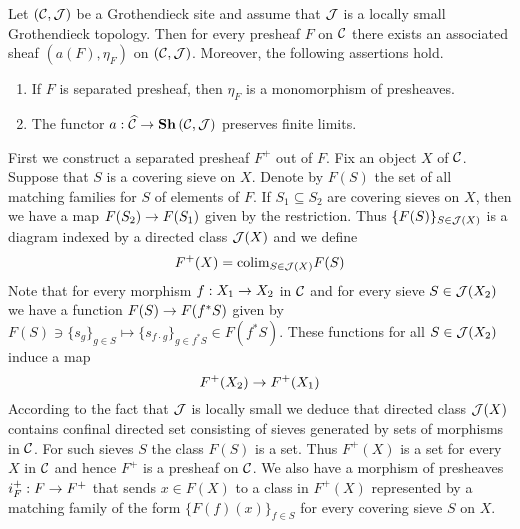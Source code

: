 \begin{theorem}\label{theorem:associatedsheaf}
Let $({\mathcal C},{\mathcal J})$ be a Grothendieck site and assume that ${\mathcal J}$ is a locally small Grothendieck topology. Then for every presheaf $F$ on ${\mathcal C}$ there exists an associated sheaf $\left(a(F),\eta_F\right)$ on $({\mathcal C},{\mathcal J})$. Moreover, the following assertions hold.
\begin{enumerate}[label=\emph{\textbf{(\arabic*)}}, leftmargin=3.0em]
\item If $F$ is separated presheaf, then $\eta_F$ is a monomorphism of presheaves.
\item The functor $a:\widehat{{\mathcal C}}\rightarrow \mathbf{Sh}\left({\mathcal C},{\mathcal J}\right)$ preserves finite limits.
\end{enumerate}
\end{theorem}
\noindent
First we construct a separated presheaf $F^+$ out of $F$. Fix an object $X$ of ${\mathcal C}$. Suppose that $S$ is a covering sieve on $X$. Denote by $F(S)$ the set of all matching families for $S$ of elements of $F$. If $S_1\subseteq S_2$ are covering sieves on $X$, then we have a map $F(S_2)\rightarrow F(S_1)$ given by the restriction. Thus $\{F(S)\}_{S\in {\mathcal J}(X)}$ is a diagram indexed by a directed class ${\mathcal J}(X)$ and we define
$$F^+(X)=\mathrm{colim}_{S\in {\mathcal J}(X)}F(S)$$
Note that for every morphism $f:X_1\rightarrow X_2$ in ${\mathcal C}$ and for every sieve $S\in {\mathcal J}(X_2)$ we have a function $F(S)\rightarrow F(f^*S)$ given by $F(S)\ni \{s_g\}_{g\in S}\mapsto \{s_{f\cdot g}\}_{g\in f^*S}\in F(f^*S)$. These functions for all $S\in {\mathcal J}(X_2)$ induce a map
$$F^+(X_2)\rightarrow F^+(X_1)$$
According to the fact that ${\mathcal J}$ is locally small we deduce that directed class ${\mathcal J}(X)$ contains confinal directed set consisting of sieves generated by sets of morphisms in ${\mathcal C}$. For such sieves $S$ the class $F(S)$ is a set. Thus $F^+(X)$ is a set for every $X$ in ${\mathcal C}$ and hence $F^+$ is a presheaf on ${\mathcal C}$. We also have a morphism of presheaves $i_F^+:F\rightarrow F^+$ that sends $x\in F(X)$ to a class in $F^+(X)$ represented by a matching family of the form $\{F(f)(x)\}_{f\in S}$ for every covering sieve $S$ on $X$.

